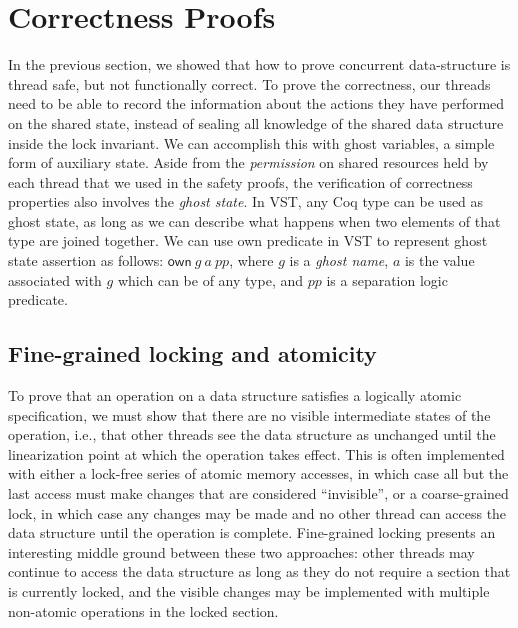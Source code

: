 \documentclass[acmsmall,screen]{acmart}\settopmatter{printfolios=true}
\begin{document}
\section{Correctness Proofs}
\label{correctness}
In the previous section, we showed that how to prove concurrent data-structure is thread safe, but not functionally correct. To prove the correctness, our threads need to be able to record the information about the actions they have performed on the shared state, instead of sealing all knowledge of the shared data structure inside the lock invariant. We can accomplish this with ghost variables, a simple form of auxiliary state. Aside from the \emph{permission} on shared resources held by each thread that we used in the safety proofs, the verification of correctness properties also involves the \emph{ghost state}. In VST, any Coq type can be used as ghost state, as long as we can describe what happens when two elements of that type are joined together. We can use own predicate in VST to represent ghost state assertion as follows: $\mathsf{own}\ g\ a\ \mathit{pp}$, where $g$ is a \emph{ghost name}, $a$ is the value associated with $g$ which can be of any type, and $\mathit{pp}$ is a separation logic predicate. 



\subsection{Fine-grained locking and atomicity}
\label{atomicity}

To prove that an operation on a data structure satisfies a logically atomic specification, we must show that there are no visible intermediate states of the operation, i.e., that other threads see the data structure as unchanged until the linearization point at which the operation takes effect. This is often implemented with either a lock-free series of atomic memory accesses, in which case all but the last access must make changes that are considered ``invisible'', or a coarse-grained lock, in which case any changes may be made and no other thread can access the data structure until the operation is complete. Fine-grained locking presents an interesting middle ground between these two approaches: other threads may continue to access the data structure as long as they do not require a section that is currently locked, and the visible changes may be implemented with multiple non-atomic operations in the locked section.
\end{document}

